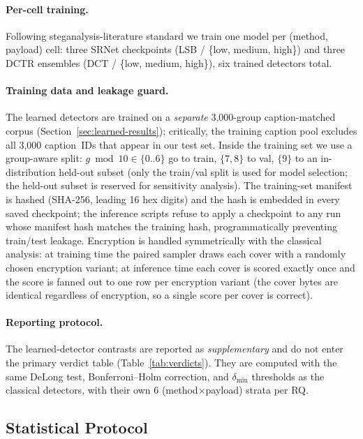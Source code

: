 \documentclass[10pt,twocolumn,a4paper]{article}
\begin{document}
\paragraph{Per-cell training.} Following steganalysis-literature standard we train one model per (method, payload) cell: three SRNet checkpoints (LSB / \{low, medium, high\}) and three DCTR ensembles (DCT / \{low, medium, high\}), six trained detectors total.

\paragraph{Training data and leakage guard.} The learned detectors are trained on a \emph{separate} 3{,}000-group caption-matched corpus (Section~\ref{sec:learned-results}); critically, the training caption pool excludes all 3{,}000 caption~IDs that appear in our test set. Inside the training set we use a group-aware split: $g\bmod 10 \in \{0..6\}$ go to train, $\{7,8\}$ to val, $\{9\}$ to an in-distribution held-out subset (only the train/val split is used for model selection; the held-out subset is reserved for sensitivity analysis). The training-set manifest is hashed (SHA-256, leading 16 hex digits) and the hash is embedded in every saved checkpoint; the inference scripts refuse to apply a checkpoint to any run whose manifest hash matches the training hash, programmatically preventing train/test leakage. Encryption is handled symmetrically with the classical analysis: at training time the paired sampler draws each cover with a randomly chosen encryption variant; at inference time each cover is scored exactly once and the score is fanned out to one row per encryption variant (the cover bytes are identical regardless of encryption, so a single score per cover is correct).

\paragraph{Reporting protocol.} The learned-detector contrasts are reported as \emph{supplementary} and do not enter the primary verdict table (Table~\ref{tab:verdicts}). They are computed with the same DeLong test, Bonferroni--Holm correction, and $\delta_\text{min}$ thresholds as the classical detectors, with their own 6 (method$\times$payload) strata per RQ.

\subsection{Statistical Protocol}
\label{sec:stats}
\end{document}
